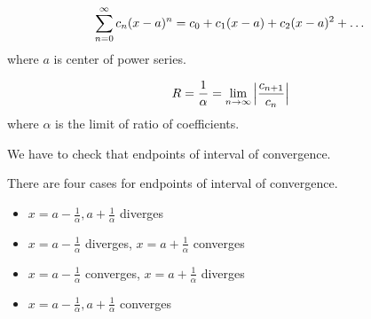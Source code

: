 \begin{definition}
  \[
    \sum_{n=0}^{\infty} c_n(x-a)^n = c_0 + c_1(x-a) + c_2(x - a)^2 + \dots
  \]
  where \(a\) is center of power series.
\end{definition}

\begin{theorem}
  \[
    R = \frac{1}{\alpha} = \lim_{n \to \infty} \Big| \frac{c_{n + 1}}{c_n} \Big|
  \]
  where \(\alpha\) is the limit of ratio of coefficients.
\end{theorem}


We have to check that endpoints of interval of convergence.

\begin{corollary}
  There are four cases for endpoints of interval of convergence.
  \begin{itemize}
    \item \(x = a - \frac{1}{\alpha}, a + \frac{1}{\alpha}\) diverges
    \item \(x = a - \frac{1}{\alpha}\) diverges, \(x = a + \frac{1}{\alpha}\) converges
    \item \(x = a - \frac{1}{\alpha}\) converges, \(x = a + \frac{1}{\alpha}\) diverges
    \item \(x = a - \frac{1}{\alpha}, a + \frac{1}{\alpha}\) converges
  \end{itemize}
\end{corollary} 


